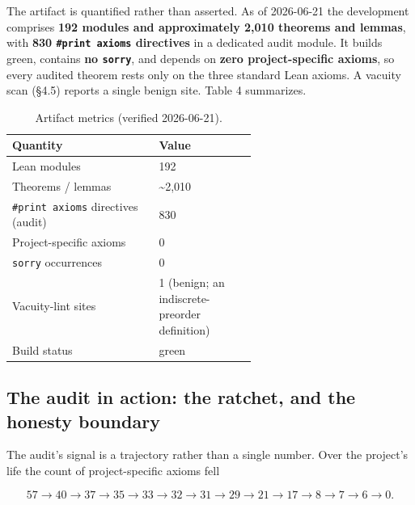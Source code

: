 \documentclass[11pt]{article}
\begin{document}
The artifact is quantified rather than asserted. As of 2026-06-21 the development comprises \textbf{192
modules and approximately 2,010 theorems and lemmas}, with \textbf{830 \texttt{\#print axioms} directives} in a
dedicated audit module. It builds green, contains \textbf{no \texttt{sorry}}, and depends on \textbf{zero
project-specific axioms}, so every audited theorem rests only on the three standard Lean axioms. A
vacuity scan (§4.5) reports a single benign site. Table 4 summarizes.

\begin{table}[ht]
\centering
\caption{Artifact metrics (verified 2026-06-21).}
\begin{tabularx}{\linewidth}{@{}>{\raggedright\arraybackslash}p{0.60\linewidth}Y@{}}
\toprule
\textbf{Quantity} & \textbf{Value} \\
\midrule
Lean modules & 192 \\
Theorems / lemmas & \textasciitilde{}2,010 \\
\texttt{\#print axioms} directives (audit) & 830 \\
Project-specific axioms & 0 \\
\texttt{sorry} occurrences & 0 \\
Vacuity-lint sites & 1 (benign; an indiscrete-preorder definition) \\
Build status & green \\
\bottomrule
\end{tabularx}
\end{table}

\subsection{The audit in action: the ratchet, and the honesty boundary}

The audit's signal is a trajectory rather than a single number. Over the project's life the count of
project-specific axioms fell

\[
57 \to 40 \to 37 \to 35 \to 33 \to 32 \to 31 \to 29 \to 21 \to 17 \to 8 \to 7 \to 6 \to 0.
\]
\end{document}
